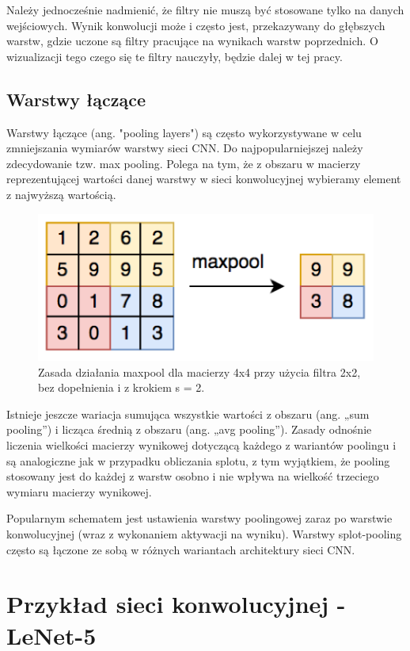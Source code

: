 Należy jednocześnie nadmienić, że filtry nie muszą być stosowane tylko na danych wejściowych. Wynik konwolucji może i często jest, przekazywany do głębszych warstw, gdzie uczone są filtry pracujące na wynikach warstw poprzednich. O wizualizacji tego czego się te filtry nauczyły, będzie dalej w tej pracy.

\subsection{Warstwy łączące}

Warstwy łączące (ang. "pooling layers") są często wykorzystywane w celu zmniejszania wymiarów warstwy sieci CNN. Do najpopularniejszej należy zdecydowanie tzw. max pooling. Polega na tym, że z obszaru w macierzy reprezentującej wartości danej warstwy w sieci konwolucyjnej wybieramy element z najwyższą wartością.

\begin{figure}[ht]
\centerline{\includegraphics[scale=1]{resources/maxpool.png}}
\caption{Zasada działania maxpool dla macierzy 4x4 przy użycia filtra 2x2, bez dopełnienia i z krokiem s = 2.}
\label{fig:maxpool}
\end{figure}

Istnieje jeszcze wariacja sumująca wszystkie wartości z obszaru (ang. „sum pooling'') i licząca średnią z obszaru (ang. „avg pooling''). Zasady odnośnie liczenia wielkości macierzy wynikowej dotyczącą każdego z wariantów poolingu i są analogiczne jak w przypadku obliczania splotu, z tym wyjątkiem, że pooling stosowany jest do każdej z warstw osobno i nie wpływa na wielkość trzeciego wymiaru macierzy wynikowej.

Popularnym schematem jest ustawienia warstwy poolingowej zaraz po warstwie konwolucyjnej (wraz z wykonaniem aktywacji na wyniku). Warstwy splot-pooling często są łączone ze sobą w różnych wariantach architektury sieci CNN.

\section{Przykład sieci konwolucyjnej - LeNet-5}
\label{lenet5}

